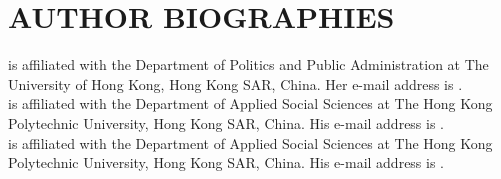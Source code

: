 \documentclass{wscpaperproc}
\begin{document}
\begingroup
\small


\endgroup

\section*{AUTHOR BIOGRAPHIES}

 is affiliated with the Department of Politics and Public Administration at The University of Hong Kong, Hong Kong SAR, China. Her e-mail address is .\\

 is affiliated with the Department of Applied Social Sciences at The Hong Kong Polytechnic University, Hong Kong SAR, China. His e-mail address is .\\

 is affiliated with the Department of Applied Social Sciences at The Hong Kong Polytechnic University, Hong Kong SAR, China. His e-mail address is .
\end{document}
